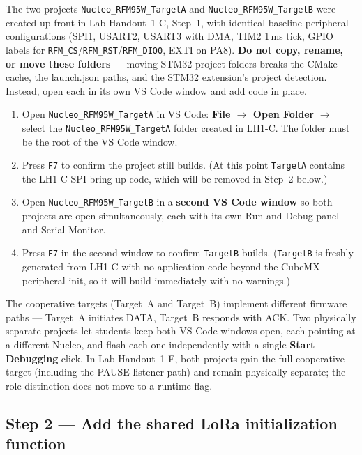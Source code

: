 \documentclass[11pt,letterpaper]{article}
\begin{document}
The two projects \texttt{Nucleo\_RFM95W\_TargetA} and \texttt{Nucleo\_RFM95W\_TargetB} were created up front in Lab Handout~1-C, Step~1, with identical baseline peripheral configurations (SPI1, USART2, USART3 with DMA, TIM2 1\,ms tick, GPIO labels for \texttt{RFM\_CS}/\texttt{RFM\_RST}/\texttt{RFM\_DIO0}, EXTI on PA8). \textbf{Do not copy, rename, or move these folders} --- moving STM32 project folders breaks the CMake cache, the launch.json paths, and the STM32 extension's project detection. Instead, open each in its own VS Code window and add code in place.

\begin{enumerate}[leftmargin=2em]
	\item Open \texttt{Nucleo\_RFM95W\_TargetA} in VS Code: \textbf{File $\to$ Open Folder} $\to$ select the \texttt{Nucleo\_RFM95W\_TargetA} folder created in LH1-C. The folder must be the root of the VS Code window.
	\item Press \texttt{F7} to confirm the project still builds. (At this point \texttt{TargetA} contains the LH1-C SPI-bring-up code, which will be removed in Step~2 below.)
	\item Open \texttt{Nucleo\_RFM95W\_TargetB} in a \textbf{second VS Code window} so both projects are open simultaneously, each with its own Run-and-Debug panel and Serial Monitor.
	\item Press \texttt{F7} in the second window to confirm \texttt{TargetB} builds. (\texttt{TargetB} is freshly generated from LH1-C with no application code beyond the CubeMX peripheral init, so it will build immediately with no warnings.)
\end{enumerate}

\begin{tcolorbox}[infobox={Why two physically separate projects with hard-coded roles?}]
	The cooperative targets (Target~A and Target~B) implement different firmware paths --- Target~A initiates DATA, Target~B responds with ACK. Two physically separate projects let students keep both VS Code windows open, each pointing at a different Nucleo, and flash each one independently with a single \textbf{Start Debugging} click. In Lab Handout~1-F, both projects gain the full cooperative-target \FSM{} (including the PAUSE listener path) and remain physically separate; the role distinction does not move to a runtime flag.
\end{tcolorbox}

\newpage
\subsection{Step 2 --- Add the shared LoRa initialization function}
\end{document}

